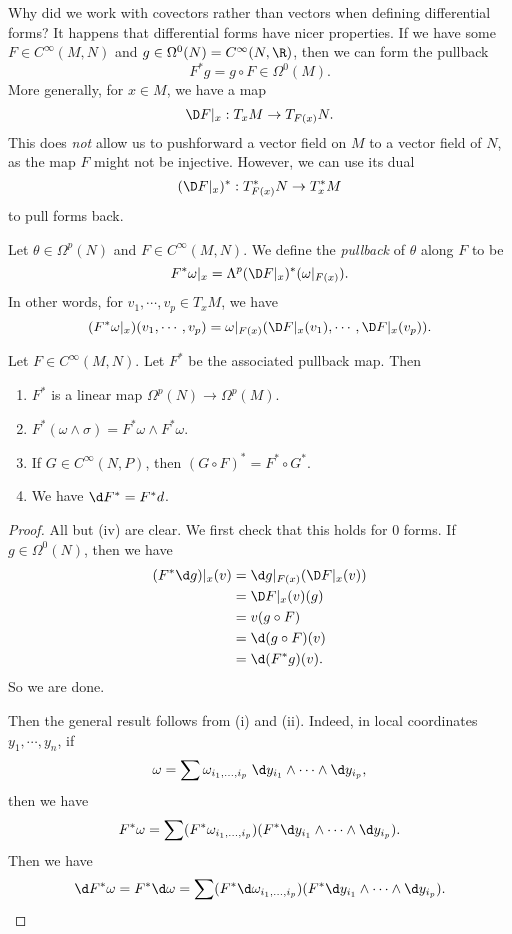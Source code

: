 \documentclass[a4paper]{article}
\begin{document}
Why did we work with covectors rather than vectors when defining differential forms? It happens that differential forms have nicer properties. If we have some $F \in C^\infty(M, N)$ and $g \in \Omega^0(N) = C^{\infty}(N, \R)$, then we can form the pullback
\[
  F^*g = g \circ F \in \Omega^0(M).
\]
More generally, for $x \in M$, we have a map
\[
  \D F|_x : T_x M \to T_{F(x)}N.
\]
This does \emph{not} allow us to pushforward a vector field on $M$ to a vector field of $N$, as the map $F$ might not be injective. However, we can use its dual
\[
  (\D F|_x)^*: T_{F(x)}^* N \to T_x^* M
\]
to pull forms back.
\begin{defi}
  Let $\theta \in \Omega^p(N)$ and $F \in C^\infty(M, N)$. We define the \emph{pullback} of $\theta$ along $F$ to be
  \[
    F^* \omega|_x = \Lambda^p(\D F|_x)^*(\omega|_{F(x)}).
  \]
  In other words, for $v_1, \cdots, v_p \in T_x M$, we have
  \[
    (F^*\omega|_x)(v_1, \cdots, v_p) = \omega|_{F(x)} (\D F|_x(v_1), \cdots, \D F|_x(v_p)).
  \]
\end{defi}

\begin{lemma}
  Let $F \in C^\infty(M, N)$. Let $F^*$ be the associated pullback map. Then
  \begin{enumerate}
    \item $F^*$ is a linear map $\Omega^p(N) \to \Omega^p(M)$.
    \item $F^*(\omega \wedge \sigma) = F^*\omega \wedge F^*\omega$.
    \item If $G \in C^\infty (N, P)$, then $(G \circ F)^* = F^* \circ G^*$.
    \item We have $\d F^* = F^* d$.
  \end{enumerate}
\end{lemma}

\begin{proof}
  All but (iv) are clear. We first check that this holds for $0$ forms. If $g \in \Omega^0(N)$, then we have
  \begin{align*}
    (F^* \d g)|_x(v) &= \d g|_{F(x)} (\D F|_x (v)) \\
    &= \D F|_x(v)(g) \\
    &= v(g \circ F) \\
    &= \d (g \circ F)(v) \\
    &= \d (F^* g)(v).
  \end{align*}
  So we are done.

  Then the general result follows from (i) and (ii). Indeed, in local coordinates $y_1, \cdots, y_n$, if
  \[
    \omega = \sum\omega_{i_1, \ldots, i_p}\; \d y_{i_1} \wedge \cdots \wedge \d y_{i_p},
  \]
  then we have
  \[
    F^* \omega = \sum (F^* \omega_{i_1, \ldots, i_p}) (F^* \d y_{i_1} \wedge \cdots \wedge \d y_{i_p}).
  \]
  Then we have
  \[
    \d F^* \omega = F^* \d \omega = \sum (F^* \d \omega_{i_1, \ldots, i_p}) (F^* \d y_{i_1} \wedge \cdots \wedge \d y_{i_p}).
  \]
\end{proof}
\end{document}
